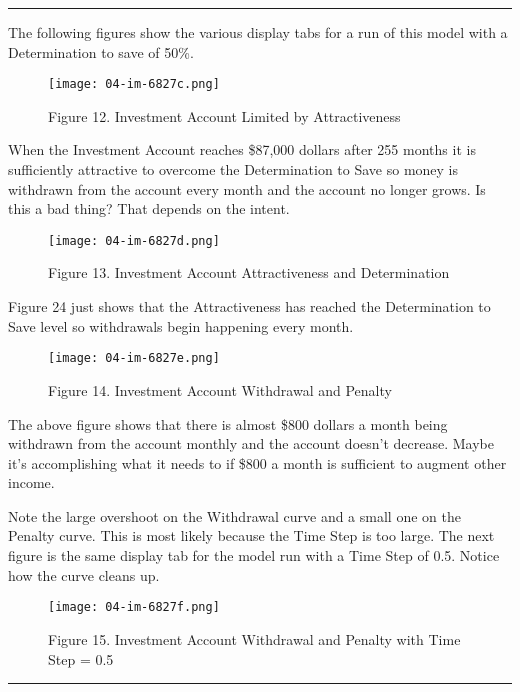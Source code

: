\documentclass[]{memoir}
\makeatletter
\def\maxwidth{\ifdim\Gin@nat@width>\linewidth\linewidth
\else\Gin@nat@width\fi}
\let\Oldincludegraphics\includegraphics
\renewcommand{\includegraphics}[1]{\Oldincludegraphics[width=\maxwidth]{#1}}
\makeatother
\begin{document}
\begin{center}\rule{3in}{0.4pt}\end{center}

The following figures show the various display tabs for a run of this
model with a Determination to save of 50\%.

\begin{figure}[htbp]
\centering
\texttt{[image: 04-im-6827c.png]}
\caption{Figure 12. Investment Account Limited by Attractiveness}
\end{figure}

When the Investment Account reaches \$87,000 dollars after 255 months it
is sufficiently attractive to overcome the Determination to Save so
money is withdrawn from the account every month and the account no
longer grows. Is this a bad thing? That depends on the intent.

\begin{figure}[htbp]
\centering
\texttt{[image: 04-im-6827d.png]}
\caption{Figure 13. Investment Account Attractiveness and Determination}
\end{figure}

Figure 24 just shows that the Attractiveness has reached the
Determination to Save level so withdrawals begin happening every month.

\begin{figure}[htbp]
\centering
\texttt{[image: 04-im-6827e.png]}
\caption{Figure 14. Investment Account Withdrawal and Penalty}
\end{figure}

The above figure shows that there is almost \$800 dollars a month being
withdrawn from the account monthly and the account doesn't decrease.
Maybe it's accomplishing what it needs to if \$800 a month is sufficient
to augment other income.

Note the large overshoot on the Withdrawal curve and a small one on the
Penalty curve. This is most likely because the Time Step is too large.
The next figure is the same display tab for the model run with a Time
Step of 0.5. Notice how the curve cleans up.

\begin{figure}[htbp]
\centering
\texttt{[image: 04-im-6827f.png]}
\caption{Figure 15. Investment Account Withdrawal and Penalty with Time
Step = 0.5}
\end{figure}

\begin{center}\rule{3in}{0.4pt}\end{center}
\end{document}
